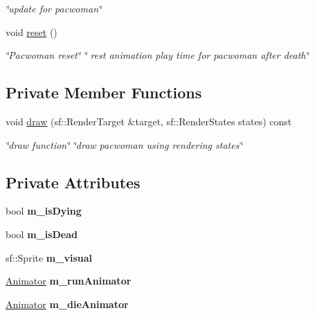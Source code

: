 \begin{DoxyCompactItemize}
\begin{DoxyCompactList}\small\item\em \char`\"{}update for pacwoman\char`\"{} \end{DoxyCompactList}\item 
\mbox{\label{classPacWoman_a2e6d72969b47ef63110e26861172f098}} 
void \hyperlink{classPacWoman_a2e6d72969b47ef63110e26861172f098}{reset} ()
\begin{DoxyCompactList}\small\item\em \char`\"{}\+Pacwoman reset\char`\"{}  \char`\"{} rest animation play time for pacwoman after death\char`\"{} \end{DoxyCompactList}\end{DoxyCompactItemize}
\subsection*{Private Member Functions}
\begin{DoxyCompactItemize}
\item 
void \hyperlink{classPacWoman_a43d3869ad2b68f87d142525409cadf09}{draw} (sf\+::\+Render\+Target \&target, sf\+::\+Render\+States states) const
\begin{DoxyCompactList}\small\item\em \char`\"{}draw function\char`\"{}  \char`\"{}draw pacwoman using rendering states\char`\"{} \end{DoxyCompactList}\end{DoxyCompactItemize}
\subsection*{Private Attributes}
\begin{DoxyCompactItemize}
\item 
\mbox{\label{classPacWoman_aa8fb5636d12e5bfb5ce7b208092ddf4e}} 
bool {\bfseries m\+\_\+is\+Dying}
\item 
\mbox{\label{classPacWoman_a2e20dea9a9e75f905f9a928604ad4872}} 
bool {\bfseries m\+\_\+is\+Dead}
\item 
\mbox{\label{classPacWoman_a0b7112fcc4e8b26b19c97606c0b92dbb}} 
sf\+::\+Sprite {\bfseries m\+\_\+visual}
\item 
\mbox{\label{classPacWoman_adfa2315b62433e0532e843675c80963f}} 
\hyperlink{classAnimator}{Animator} {\bfseries m\+\_\+run\+Animator}
\item 
\mbox{\label{classPacWoman_a5314f24950aa55fb46377934230f4b1c}} 
\hyperlink{classAnimator}{Animator} {\bfseries m\+\_\+die\+Animator}
\end{DoxyCompactItemize}
